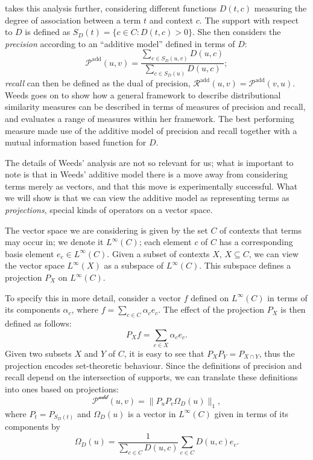 \cite{Weeds:03} takes this analysis further, considering different functions $D(t,c)$ measuring the degree of association between a term $t$ and context $c$. The support with respect to $D$ is defined as $S_D(t) = \{c \in C : D(t,c) > 0\}$. She then considers the \emph{precision} according to an ``additive model'' defined in terms of $D$:
$$\mathcal{P}^\textrm{add}(u,v) = \frac{\sum_{c \in S_D(u,v)} D(u,c)}{\sum_{c\in S_D(u)} D(u,c)};$$
\emph{recall} can then be defined as the dual of precision, $\mathcal{R}^\textrm{add}(u,v) = \mathcal{P}^\textrm{add}(v,u)$. Weeds goes on to show how a general framework to describe distributional similarity measures can be described in terms of measures of precision and recall, and evaluates a range of measures within her framework. The best performing measure made use of the additive model of precision and recall together with a mutual information based function for $D$.

The details of Weeds' analysis are not so relevant for us; what is important to note is that in Weeds' additive model there is a move away from considering terms merely as vectors, and that this move is experimentally successful. What we will show is that we can view the additive model as representing terms as \emph{projections}, special kinds of operators on a vector space.

The vector space we are considering is given by the set $C$ of contexts that terms may occur in; we denote it $L^\infty(C)$; each element $c$ of $C$ has a corresponding basis element $e_c \in L^\infty(C)$. Given a subset of contexts $X$, $X\subseteq C$, we can view the vector space $L^\infty(X)$ as a subspace of $L^\infty(C)$. This subspace defines a projection $P_X$ on $L^\infty(C)$.

To specify this in more detail, consider a vector $f$ defined on $L^\infty(C)$ in terms of its components $\alpha_c$, where $f = \sum_{c\in C} \alpha_c e_c.$
The effect of the projection $P_X$ is then defined as follows:
$$P_Xf = \sum_{c \in X} \alpha_c e_c.$$
Given two subsets $X$ and $Y$ of $C$, it is easy to see that $P_XP_Y = P_{X \cap Y}$, thus the projection encodes set-theoretic behaviour. Since the definitions of precision and recall depend on the intersection of supports, we can translate these definitions into ones based on projections:
$$\mathcal{P^\textrm{add}}(u,v) = \|P_uP_v\Omega_D(u)\|_1,$$
where $P_t = P_{S_D(t)}$ and $\Omega_D(u)$ is a vector in $L^\infty(C)$ given in terms of its components by
$$\Omega_D(u) = \frac{1}{\sum_{c\in C} D(u,c)}\sum_{c \in C}D(u,c)e_c.$$

